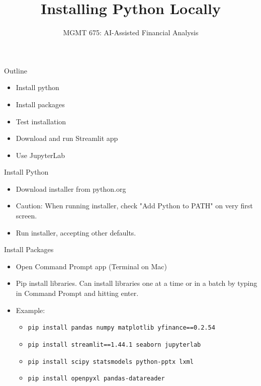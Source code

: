 \documentclass[10pt]{beamer}
\title{Installing Python Locally}
\subtitle{MGMT 675: AI-Assisted Financial Analysis}
\date{}
\begin{document}
\begin{frame}[plain]
\titlepage
\end{frame}

\begin{frame}{Outline}
\begin{itemize}
\item Install python
\item Install packages
\item Test installation
\item Download and run Streamlit app
\item Use JupyterLab
\end{itemize}
\end{frame}

\begin{frame}{Install Python}
\begin{itemize}
    \item Download installer from python.org
    \item \alert{Caution:} When running installer, check "Add Python to PATH" \alert{on very first screen}.
    \item Run installer, accepting other defaults.
\end{itemize}
\end{frame}

\begin{frame}{Install Packages}
\begin{itemize}
    \item Open Command Prompt app (Terminal on Mac)
    \item Pip install libraries.  Can install libraries one at a time or in a batch by typing in Command Prompt and hitting enter.
    \item Example: 
    \begin{itemize}
        \item \texttt{pip install pandas numpy matplotlib yfinance==0.2.54}
        \item \texttt{pip install streamlit==1.44.1 seaborn jupyterlab}
        \item \texttt{pip install scipy statsmodels python-pptx lxml}
        \item \texttt{pip install openpyxl pandas-datareader}
    \end{itemize}
\end{itemize}
\end{frame}
\end{document}
